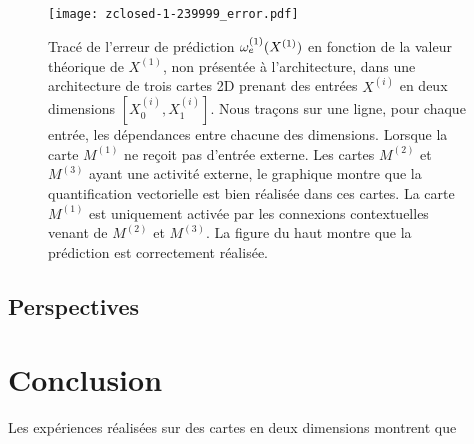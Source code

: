 \documentclass[../main]{subfiles}
\begin{document}
\begin{figure}
\texttt{[image: zclosed-1-239999\_error.pdf]}
\caption{Tracé de l'erreur de prédiction $\omega_e^{({1})}(X^{({1})})$ en fonction de la valeur théorique de $X^{(1)}$, non présentée à l'architecture, dans une architecture de trois cartes 2D prenant des entrées $X^{(i)}$ en deux dimensions $[X^{(i)}_0, X^{(i)}_1]$. Nous traçons sur une ligne, pour chaque entrée, les dépendances entre chacune des dimensions.
Lorsque la carte $M^{(1)}$ ne reçoit pas d'entrée externe. Les cartes $M^{(2)}$ et $M^{(3)}$ ayant une activité externe, le graphique montre que la quantification vectorielle est bien réalisée dans ces cartes. La carte $M^{(1)}$ est uniquement activée par les connexions contextuelles venant de $M^{(2)}$ et $M^{(3)}$. La figure du haut montre que la prédiction est correctement réalisée.\label{fig:3som_pred}}
\end{figure}



\subsection{Perspectives}

\section{Conclusion}

Les expériences réalisées sur des cartes en deux dimensions montrent que 


\ifSubfilesClassLoaded{
    \printbibliography
}{}
\end{document}
